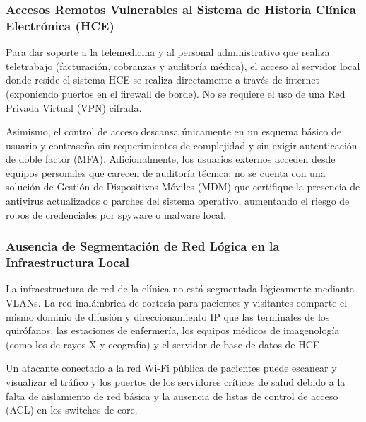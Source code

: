 \subsubsection{Accesos Remotos Vulnerables al Sistema de Historia Clínica Electrónica (HCE)}
Para dar soporte a la telemedicina y al personal administrativo que realiza teletrabajo (facturación, cobranzas y auditoría médica), el acceso al servidor local donde reside el sistema HCE se realiza directamente a través de internet (exponiendo puertos en el firewall de borde). No se requiere el uso de una Red Privada Virtual (VPN) cifrada.
    
Asimismo, el control de acceso descansa únicamente en un esquema básico de usuario y contraseña sin requerimientos de complejidad y sin exigir autenticación de doble factor (MFA). Adicionalmente, los usuarios externos acceden desde equipos personales que carecen de auditoría técnica; no se cuenta con una solución de Gestión de Dispositivos Móviles (MDM) que certifique la presencia de antivirus actualizados o parches del sistema operativo, aumentando el riesgo de robos de credenciales por spyware o malware local.

\subsubsection{Ausencia de Segmentación de Red Lógica en la Infraestructura Local}
La infraestructura de red de la clínica no está segmentada lógicamente mediante VLANs. La red inalámbrica de cortesía para pacientes y visitantes comparte el mismo dominio de difusión y direccionamiento IP que las terminales de los quirófanos, las estaciones de enfermería, los equipos médicos de imagenología (como los de rayos X y ecografía) y el servidor de base de datos de HCE.
    
Un atacante conectado a la red Wi-Fi pública de pacientes puede escanear y visualizar el tráfico y los puertos de los servidores críticos de salud debido a la falta de aislamiento de red básica y la ausencia de listas de control de acceso (ACL) en los switches de core.

